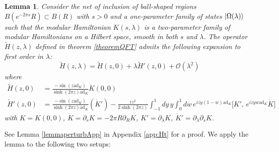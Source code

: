 \documentclass[a4paper,11pt]{article}
\newtheorem{lemma}[theorem]{Lemma}
\theoremstyle{definition}
\newcommand{\p}{\partial}
\newcommand{\ad}{\text{ad}}
\begin{document}
\begin{lemma}\label{lemma:perturb}
Consider the net of inclusion of ball-shaped regions $B(e^{-2\pi s}R)\subset B(R)$ with $s>0$ and a one-parameter family of states $\ket{\Omega(\lambda)}$ such that the modular Hamiltonian $K(s, \lambda)$ is a two-parameter family of modular Hamiltonians on a Hilbert space, smooth in both $s$ and $\lambda$. The operator $\tilde{H}(z,\lambda)$ defined in theorem \ref{theoremQFT} admits the following expansion to first order in $\lambda$:
\begin{equation}
    \tilde{H}(z, \lambda) = \tilde{H}(z,0) + \lambda \tilde{H}'(z,0) + \mathcal{O}(\lambda^2)
\end{equation}
where 
\begin{align}
    \tilde{H}(z,0) &= \frac{{-}\sin(z \ad_K)}{\sinh(2\pi z) \ad_K} \dot{K}(0,0)\\
    \tilde{H}'(z,0) &= \frac{{-}\sin(z \ad_K)}{\sinh(2\pi z) \ad_K} (\dot{K}') {-} \frac{iz^2}{2\sinh(2\pi z)} \int_{-1}^{1} dy \, y \int_0^1 dw \, e^{izy(1-w)\ad_K} \Big[ K', \, e^{izyw\ad_K} \dot{K} \Big]\label{Hprimez0}
\end{align}
with $K = K(0,0)$, $\dot{K} = \p_s K=-2\pi R\p_R K$, $K' = \p_\lambda K$, $\dot{K}' = \p_\lambda \p_s K$. 
\end{lemma}
See Lemma \ref{lemmaperturbApp} in Appendix \ref{app:Ht} for a proof. We apply the lemma to the following two setups:
\end{document}
